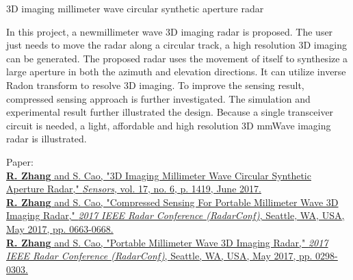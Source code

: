 \documentclass[letterpaper,9pt]{article}
\renewenvironment{itemize}{
  \begin{list}{}{
    \setlength{\topsep}{0pt}
    \setlength{\itemsep}{0pt}
    \setlength{\parsep}{0pt}
    \setlength{\partopsep}{0pt}
    \setlength{\leftmargin}{1.5em}
  }
}{\end{list}}
\begin{document}
\begin{itemize}
  \item 3D imaging millimeter wave circular synthetic aperture radar
  \begin{itemize}
    \item [$\bullet$] In this project, a newmillimeter wave 3D imaging radar is proposed. The user just needs to move the radar along a circular track, a high resolution 3D imaging can be generated. The proposed radar uses the movement of itself to synthesize a large aperture in both the azimuth and elevation directions. It can utilize inverse Radon transform to resolve 3D imaging. To improve the sensing result, compressed sensing approach is further investigated. The simulation and experimental result further illustrated the design. Because a single transceiver circuit is needed, a light, affordable and high resolution 3D mmWave imaging radar is illustrated.
    \item [$\bullet$] Paper: \\
    \href{http://www.mdpi.com/1424-8220/17/6/1419}{{\bf R. Zhang} and S. Cao, "3D Imaging Millimeter Wave Circular Synthetic Aperture Radar," {\it Sensors}, vol. 17, no. 6, p. 1419, June 2017.} \\
    \href{http://ieeexplore.ieee.org/document/7944286/}{{\bf R. Zhang} and S. Cao, "Compressed Sensing For Portable Millimeter Wave 3D Imaging Radar," {\it 2017 IEEE Radar Conference (RadarConf)}, Seattle, WA, USA, May 2017, pp. 0663-0668.} \\
    \href{http://ieeexplore.ieee.org/abstract/document/7944216/}{{\bf R. Zhang} and S. Cao, "Portable Millimeter Wave 3D Imaging Radar," {\it 2017 IEEE Radar Conference (RadarConf)}, Seattle, WA, USA, May 2017, pp. 0298-0303.}
  \end{itemize}


\end{itemize}
\end{document}

